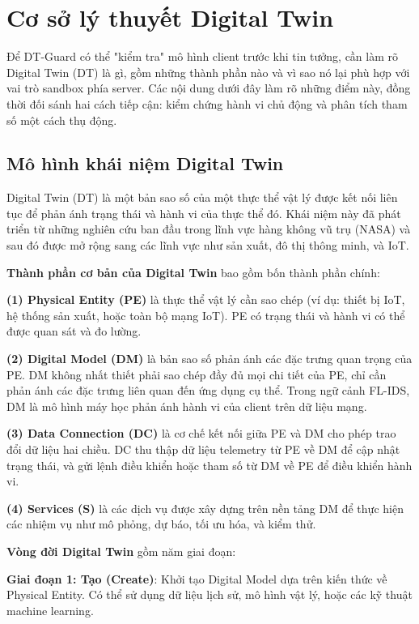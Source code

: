 \section{Cơ sở lý thuyết Digital Twin}
Để DT-Guard có thể "kiểm tra" mô hình client trước khi tin tưởng, cần làm rõ Digital Twin (DT) là gì, gồm những thành phần nào và vì sao nó lại phù hợp với vai trò sandbox phía server. Các nội dung dưới đây làm rõ những điểm này, đồng thời đối sánh hai cách tiếp cận: kiểm chứng hành vi chủ động và phân tích tham số một cách thụ động.

\subsection{Mô hình khái niệm Digital Twin}
Digital Twin (DT) là một bản sao số của một thực thể vật lý được kết nối liên tục để phản ánh trạng thái và hành vi của thực thể đó. Khái niệm này đã phát triển từ những nghiên cứu ban đầu trong lĩnh vực hàng không vũ trụ (NASA) và sau đó được mở rộng sang các lĩnh vực như sản xuất, đô thị thông minh, và IoT.

\textbf{Thành phần cơ bản của Digital Twin} bao gồm bốn thành phần chính:

\textbf{(1) Physical Entity (PE)} là thực thể vật lý cần sao chép (ví dụ: thiết bị IoT, hệ thống sản xuất, hoặc toàn bộ mạng IoT). PE có trạng thái và hành vi có thể được quan sát và đo lường.

\textbf{(2) Digital Model (DM)} là bản sao số phản ánh các đặc trưng quan trọng của PE. DM không nhất thiết phải sao chép đầy đủ mọi chi tiết của PE, chỉ cần phản ánh các đặc trưng liên quan đến ứng dụng cụ thể. Trong ngữ cảnh FL-IDS, DM là mô hình máy học phản ánh hành vi của client trên dữ liệu mạng.

\textbf{(3) Data Connection (DC)} là cơ chế kết nối giữa PE và DM cho phép trao đổi dữ liệu hai chiều. DC thu thập dữ liệu telemetry từ PE về DM để cập nhật trạng thái, và gửi lệnh điều khiển hoặc tham số từ DM về PE để điều khiển hành vi.

\textbf{(4) Services (S)} là các dịch vụ được xây dựng trên nền tảng DM để thực hiện các nhiệm vụ như mô phỏng, dự báo, tối ưu hóa, và kiểm thử.

\textbf{Vòng đời Digital Twin} gồm năm giai đoạn:

\textbf{Giai đoạn 1: Tạo (Create)}: Khởi tạo Digital Model dựa trên kiến thức về Physical Entity. Có thể sử dụng dữ liệu lịch sử, mô hình vật lý, hoặc các kỹ thuật machine learning.


